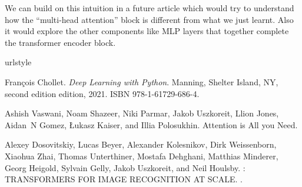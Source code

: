 \documentclass{../template/texnote}
\begin{document}
We can build on this intuition in a future article which would try to understand how the ``multi-head attention'' block is different from what we just learnt.
Also it would explore the other components like MLP layers that together complete the transformer encoder block.
\cite{dosovitskiyIMAGEWORTH16X162021}
\begin{thebibliography}{2}
\providecommand{\natexlab}[1]{#1}
\providecommand{\url}[1]{\texttt{#1}}
\expandafter\ifx\csname urlstyle\endcsname\relax
  \providecommand{\doi}[1]{doi: #1}\else
  \providecommand{\doi}{doi: \begingroup \urlstyle{rm}\Url}\fi

Fran{\c c}ois Chollet.
\newblock \emph{Deep Learning with {{Python}}}.
\newblock Manning, Shelter Island, NY, second edition edition, 2021.
\newblock ISBN 978-1-61729-686-4.

Ashish Vaswani, Noam Shazeer, Niki Parmar, Jakob Uszkoreit, Llion Jones,
  Aidan~N Gomez, {\L}ukasz Kaiser, and Illia Polosukhin.
\newblock Attention is {{All}} you {{Need}}.

Alexey Dosovitskiy, Lucas Beyer, Alexander Kolesnikov, Dirk Weissenborn,
  Xiaohua Zhai, Thomas Unterthiner, Mostafa Dehghani, Matthias Minderer, Georg
  Heigold, Sylvain Gelly, Jakob Uszkoreit, and Neil Houlsby.
: {{TRANSFORMERS FOR IMAGE
  RECOGNITION AT SCALE}}.
.

\end{thebibliography}

\vspace{0.5cm}
\noindent{}
    \printbibliography
\end{document}
